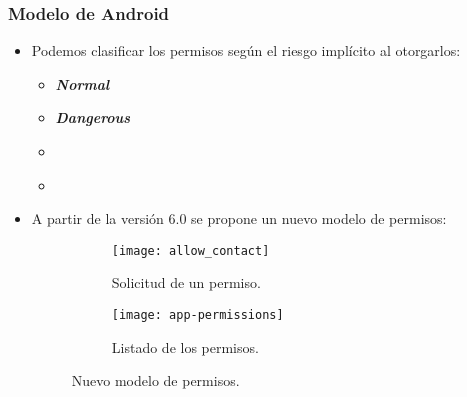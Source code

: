 \begin{frame}
 \frametitle{Modelo de Android}
 \begin{small}
 \begin{itemize}
     \item Podemos clasificar los permisos según el riesgo implícito al otorgarlos:
     \begin{multicols}{2}
     \begin{itemize}[<+->]\small
      \item \emph{\textbf<5->{Normal}}
      \item \emph{\textbf<5->{Dangerous}}
      \item \emph{}
      \item \emph{}
     \end{itemize}
     \end{multicols}\pause
     \item A partir de la versión 6.0 se propone un nuevo modelo de permisos:\pause
         \begin{figure}[btp]
            \begin{subfigure}{0.4\linewidth}
            \centering
                \texttt{[image: allow\_contact]}
                \caption{Solicitud de un permiso.}
            \end{subfigure}
        \begin{subfigure}{0.4\linewidth}\pause
        \centering
            \texttt{[image: app-permissions]}
            \caption{Listado de los permisos.}
    	\end{subfigure}
    	\caption{Nuevo modelo de permisos.}
        \end{figure}
 \end{itemize}
  \end{small}
\end{frame}
